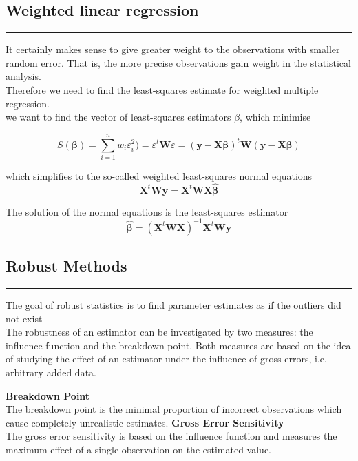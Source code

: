 \subsection{Weighted linear regression}
\noindent\rule[\linienAbstand]{\linewidth}{\linienDicke}
It certainly makes sense to give greater weight to the observations with smaller random error. That is, the more precise observations gain weight in the statistical analysis.\\
Therefore we need to find the least-squares estimate for weighted multiple regression.\\
we want to find the vector of least-squares estimators $\beta$, which minimise

\begin{equation}
  S(\mathbf{\beta}) = \sum^n_{i = 1}w_i\varepsilon^2_i) = \varepsilon^t \mathbf{W} \varepsilon =
  (\mathbf{y}-\mathbf{X}\mathbf{\beta})^t \mathbf{W}(\mathbf{y}-\mathbf{X}\mathbf{\beta})
\end{equation}

which simplifies to the so-called weighted least-squares normal equations
\begin{equation}
  \mathbf{X}^t\mathbf{Wy} = \mathbf{X}^t\mathbf{WX}\hat{\pmb{\beta}}
\end{equation}

The solution of the normal equations is the least-squares estimator
\begin{equation}
  \hat{\pmb{\beta}} = (\mathbf{X}^t\mathbf{WX})^{-1} \mathbf{X}^t\mathbf{Wy}
\end{equation}


\subsection{Robust Methods}
\noindent\rule[\linienAbstand]{\linewidth}{\linienDicke}
The goal of robust statistics is to find parameter estimates as if the outliers did not exist\\

The robustness of an estimator can be investigated by two measures: the influence function and the breakdown point. Both measures are based on the idea of studying the effect of an estimator under the influence of gross errors, i.e. arbitrary added data.

\textbf{Breakdown Point}\\
The breakdown point is the minimal proportion of incorrect observations which cause completely unrealistic estimates.
\textbf{Gross Error Sensitivity}\\
The gross error sensitivity is based on the influence function and measures the maximum effect of a single observation on the estimated value.

